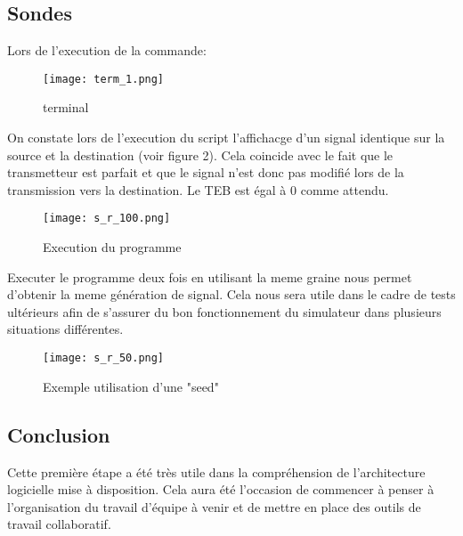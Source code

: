 \subsection{Sondes}

Lors de l'execution de la commande: 

\begin{figure}[h]
    \centering
    \texttt{[image: term\_1.png]}
    \caption{terminal}
\end{figure}

On constate lors de l'execution du script l'affichacge d'un signal identique sur la source et la destination (voir figure 2). Cela coincide 
avec le fait que le transmetteur est parfait et que le signal n'est donc pas modifié lors de la transmission vers la destination.
Le TEB est égal à 0 comme attendu.

\begin{figure}[h]
    \centering
    \texttt{[image: s\_r\_100.png]}
    \caption{Execution du programme}
\end{figure}

\pagebreak

Executer le programme deux fois en utilisant la meme graine nous permet d'obtenir la meme génération de signal.
Cela nous sera utile dans le cadre de tests ultérieurs afin de s'assurer du bon fonctionnement du simulateur dans plusieurs situations différentes.

\begin{figure}[h]
    \centering
    \texttt{[image: s\_r\_50.png]}
    \caption{Exemple utilisation d'une "seed"}
\end{figure}


\subsection{Conclusion}

Cette première étape a été très utile dans la compréhension de l'architecture logicielle mise à disposition.
Cela aura été l'occasion de commencer à penser à l'organisation du travail d'équipe à venir et de mettre en place des outils de travail collaboratif.



